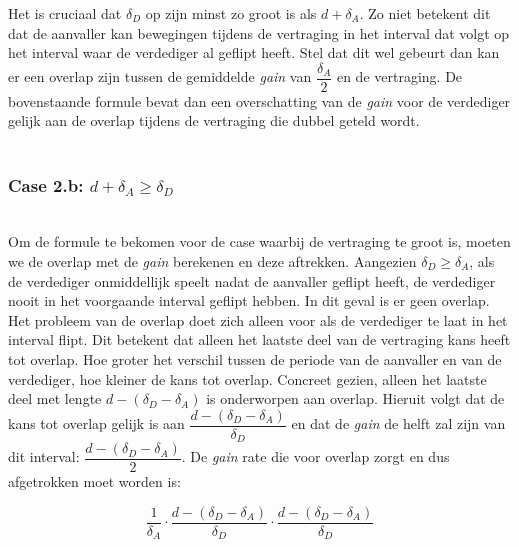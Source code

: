 \documentclass[master=cws, masteroption=vs,english]{kulemt}
\begin{document}
\begin{abstract*}
Het is cruciaal dat $ \delta_{D}$ op zijn minst zo groot is als $d + \delta_{A}$. Zo niet betekent dit dat de aanvaller kan bewegingen tijdens de vertraging in het interval dat volgt op het interval waar de verdediger al geflipt heeft. Stel dat dit wel gebeurt dan kan er een overlap zijn tussen de gemiddelde \textit{gain} van $\dfrac{\delta_{A}}{2}$ en de vertraging. De bovenstaande formule bevat dan een overschatting van de \textit{gain} voor de verdediger gelijk aan de overlap tijdens de vertraging die dubbel geteld wordt. \\


~~ \\
\subsubsection*{\textbf{Case 2.b:} $d + \delta_{A} \geq \delta_{D}$}
~~~\\

Om de formule te bekomen voor de case waarbij de vertraging te groot is, moeten we de overlap met de \textit{gain} berekenen en deze aftrekken. 
Aangezien $\delta_{D} \geq \delta_{A}$, als de verdediger onmiddellijk speelt nadat de aanvaller geflipt heeft, de verdediger nooit in het voorgaande interval geflipt hebben. In dit geval is er geen overlap. Het probleem van de overlap doet zich alleen voor als de verdediger te laat in het interval flipt. Dit betekent dat alleen het laatste deel van de vertraging kans heeft tot overlap. Hoe groter het verschil tussen de periode van de aanvaller en van de verdediger, hoe kleiner de kans tot overlap. Concreet gezien, alleen het laatste deel met lengte $d - (\delta_{D} - \delta_{A})$ is onderworpen aan overlap. Hieruit volgt dat de kans tot overlap gelijk is aan $\dfrac{ d - (\delta_{D} - \delta_{A})}{\delta_{D}}$ en dat de \textit{gain} de helft zal zijn van dit interval: $\dfrac{ d - (\delta_{D} - \delta_{A})}{2}$.  De \textit{gain} rate die voor overlap zorgt en dus afgetrokken moet worden is:

\begin{equation}\label{first}
\dfrac{1} {\delta_{A}} \cdot \dfrac{d - (\delta_{D} - \delta_{A})}{\delta_{D}} \cdot \dfrac{d - (\delta_{D} - \delta_{A})}{\delta_{D}}
\end{equation}


\end{abstract*}
\end{document}
